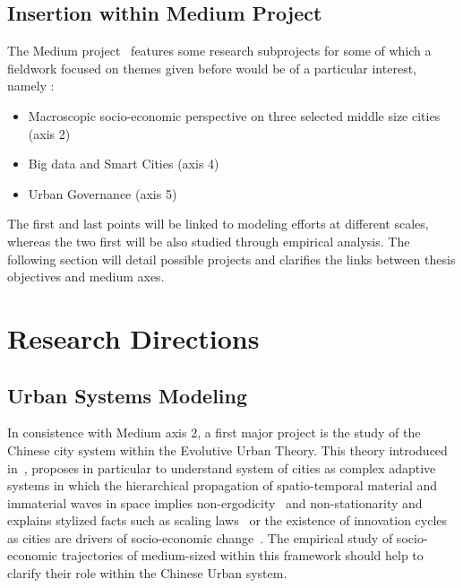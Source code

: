 \subsection{Insertion within Medium Project}

The Medium project~\cite{aveline2016medium} features some research subprojects for some of which a fieldwork focused on themes given before would be of a particular interest, namely :

\begin{itemize}
\item Macroscopic socio-economic perspective on three selected middle size cities (axis 2) %
\item Big data and Smart Cities (axis 4)
\item Urban Governance (axis 5)
\end{itemize}

The first and last points will be linked to modeling efforts at different scales, whereas the two first will be also studied through empirical analysis. The following section will detail possible projects and clarifies the links between thesis objectives and medium axes.





\section{Research Directions}

\subsection{Urban Systems Modeling}

In consistence with Medium axis 2, a first major project is the study of the Chinese city system within the Evolutive Urban Theory. This theory introduced in~\cite{pumain1997pour}, proposes in particular to understand system of cities as complex adaptive systems in which the hierarchical propagation of spatio-temporal material and immaterial waves in space implies non-ergodicity~\cite{pumain2012urban} and non-stationarity and explains stylized facts such as scaling laws~\cite{pumain2006evolutionary} or the existence of innovation cycles as cities are drivers of socio-economic change~\cite{pumain2010theorie}. The empirical study of socio-economic trajectories of medium-sized within this framework should help to clarify their role within the Chinese Urban system.




